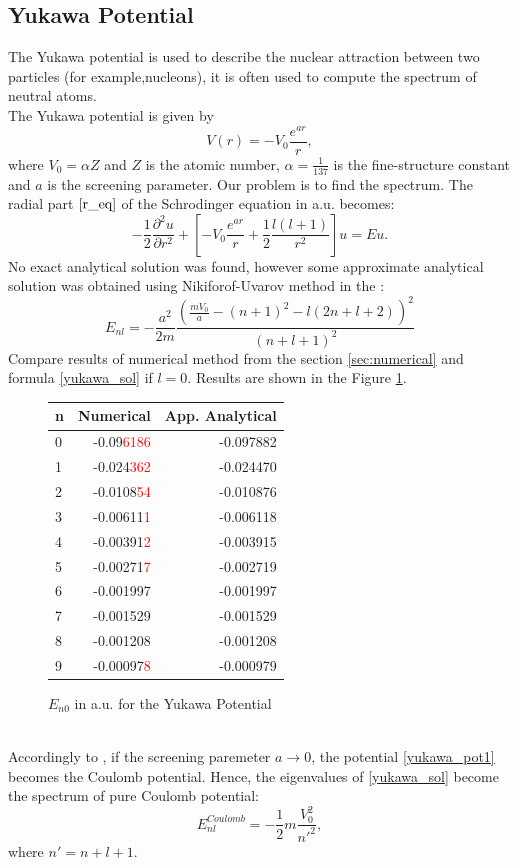 \documentclass[a4paper, 11pt]{article}
\begin{document}
\subsection{Yukawa Potential}
The Yukawa potential is used to  describe the nuclear attraction between two particles (for example,nucleons), it is often used to compute the spectrum of neutral atoms.\\ 
The Yukawa potential is given by
\begin{equation}\label{yukawa_pot1}
    V(r) = -V_0\frac{e^{a r}}{r},
\end{equation}
where $V_0 = \alpha Z$ and $Z$ is the atomic number, $\alpha = \frac{1}{137}$ is the fine-structure constant and $a$ is the screening parameter.
Our problem is to find the spectrum. The radial part $\eqref{r_eq}$ of the Schrodinger equation in a.u. becomes:
$$-\frac{1}{2}\frac{\partial^2 u}{\partial r^2}+[-V_0\frac{e^{a r}}{r} +\frac{1}{2}\frac{l(l+1)}{r^2}]u = Eu.$$
No exact analytical solution was found, however some approximate analytical solution was obtained using Nikiforof-Uvarov method in the \cite{hamzavi2012approximate}: 
\begin{equation}\label{yukawa_sol}
    E_{nl} = -\frac{a^2}{2m}\frac{(\displaystyle{\frac{m V_0}{a}} - (n+1)^2 - l(2n+l+2))^2}{(n+l+1)^2}
\end{equation}
Compare results of numerical method from the section \ref{sec:numerical} and formula \eqref{yukawa_sol} if $l = 0$. Results are shown in the Figure \ref{fig:Yakawa_spec1}.
\begin{figure}[h!]
\centering
\begin{tabular}{lrr}
\toprule
{n} &  Numerical   &         App. Analytical \\
\midrule
0 & -0.09\textcolor{red}{6186} & -0.097882 \\
1 & -0.024\textcolor{red}{362} & -0.024470 \\
2 & -0.0108\textcolor{red}{54} & -0.010876 \\
3 & -0.00611\textcolor{red}{1} & -0.006118 \\
4 & -0.00391\textcolor{red}{2} & -0.003915 \\
5 & -0.00271\textcolor{red}{7} & -0.002719 \\
6 & -0.001997 & -0.001997 \\
7 & -0.001529 & -0.001529 \\
8 & -0.001208 & -0.001208 \\
9 & -0.00097\textcolor{red}{8} & -0.000979 \\
\bottomrule
\end{tabular}
\caption{$E_{n0}$ in a.u. for the Yukawa Potential}
\label{fig:Yakawa_spec1}
\end{figure}\\
Accordingly to \cite{hamzavi2012approximate}, if the screening paremeter $ a\to 0$, the potential \eqref{yukawa_pot1} becomes the Coulomb potential. Hence, the eigenvalues of \eqref{yukawa_sol} become the spectrum of pure Coulomb potential:
$$E_{nl}^{Coulomb} = -\frac{1}{2} m \frac{V_0^2}{n'^2},$$
where $n' = n+l+1.$
\end{document}
